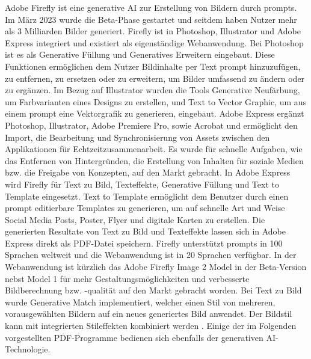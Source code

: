 Adobe Firefly ist eine generative AI zur Erstellung von Bildern durch prompts. Im März 2023 wurde die Beta-Phase gestartet und seitdem haben Nutzer mehr als 3 Milliarden Bilder generiert. Firefly ist in Photoshop, Illustrator und Adobe Express integriert und existiert als eigenständige Webanwendung. Bei Photoshop ist es als Generative Füllung und Generatives Erweitern eingebaut. Diese Funktionen ermöglichen dem Nutzer Bildinhalte per Text prompt hinzuzufügen, zu entfernen, zu ersetzen oder zu erweitern, um Bilder umfassend zu ändern oder zu ergänzen. Im Bezug auf Illustrator wurden die Tools Generative Neufärbung, um Farbvarianten eines Designs zu erstellen, und Text to Vector Graphic, um aus einem prompt eine Vektorgrafik zu generieren, eingebaut. Adobe Express ergänzt Photoshop, Illustrator, Adobe Premiere Pro, sowie Acrobat und ermöglicht den Import, die Bearbeitung und Synchronisierung von Assets zwischen den Applikationen für Echtzeitzusammenarbeit. Es wurde für schnelle Aufgaben, wie das Entfernen von Hintergründen, die Erstellung von Inhalten für soziale Medien bzw. die Freigabe von Konzepten, auf den Markt gebracht. In Adobe Express wird Firefly für Text zu Bild, Texteffekte, Generative Füllung und Text to Template eingesetzt. Text to Template ermöglicht dem Benutzer durch einen prompt editierbare Templates zu generieren, um auf schnelle Art und Weise Social Media Posts, Poster, Flyer und digitale Karten zu erstellen. Die generierten Resultate von Text zu Bild und Texteffekte lassen sich in Adobe Express direkt als PDF-Datei speichern. Firefly unterstützt prompts in 100 Sprachen weltweit und die Webanwendung ist in 20 Sprachen verfügbar. In der Webanwendung ist kürzlich das Adobe Firefly Image 2 Model in der Beta-Version nebst Model 1 für mehr Gestaltungsmöglichkeiten und verbesserte Bildberechnung bzw. -qualität auf den Markt gebracht worden. Bei Text zu Bild wurde Generative Match implementiert, welcher einen Stil von mehreren, vorausgewählten Bildern auf ein neues generiertes Bild anwendet. Der Bildstil kann mit integrierten Stileffekten kombiniert werden \cite{adobe-firefly}. Einige der im Folgenden vorgestellten PDF-Programme bedienen sich ebenfalls der generativen AI-Technologie.